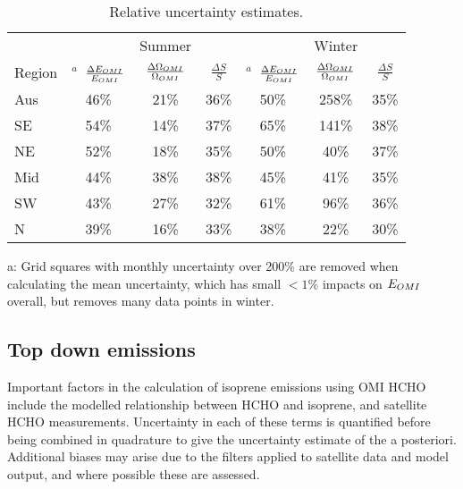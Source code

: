   \begin{table}\begin{threeparttable}
      \caption{Relative uncertainty estimates.}
      \begin{tabular}{ l | c  c  c | c c c} 
        \toprule
        & & Summer & & & Winter & \\
        Region & $^a$~$\frac{\Delta E_{OMI}}{E_{OMI}}$ & $\frac{\Delta \Omega_{OMI}}{\Omega_{OMI}}$ & $\frac{\Delta S}{S}$ 
          & $^a$~$\frac{\Delta E_{OMI}}{E_{OMI}}$ & $\frac{\Delta \Omega_{OMI}}{\Omega_{OMI}}$ & $\frac{\Delta S}{S}$ \\
        \midrule
          Aus &   46\% &   21\% &   36\% &   50\% &  258\% &   35\% \\
          SE &   54\% &   14\% &   37\% &   65\% &  141\% &   38\% \\
          NE &   52\% &   18\% &   35\% &   50\% &   40\% &   37\% \\
          Mid &   44\% &   38\% &   38\% &   45\% &   41\% &   35\% \\
          SW &   43\% &   27\% &   32\% &   61\% &   96\% &   36\% \\
          N &   39\% &   16\% &   33\% &   38\% &   22\% &   30\% \\
        \bottomrule
      \end{tabular}
      \begin{tablenotes} 
        \item a: Grid squares with monthly uncertainty over 200\% are removed when calculating the mean uncertainty, which has small $<1\%$ impacts on $E_{OMI}$ overall, but removes many data points in winter. 
      \end{tablenotes}
      \label{BioIsop:uncertainty:tab_uncertainties}
    \end{threeparttable}\end{table}
    
    
    
  \subsection{Top down emissions}
    \label{BioIsop:uncertainty:eomi}
    
    Important factors in the calculation of isoprene emissions using OMI HCHO include the modelled relationship between HCHO and isoprene, and satellite HCHO measurements.
    Uncertainty in each of these terms is quantified before being combined in quadrature to give the uncertainty estimate of the a posteriori.
    Additional biases may arise due to the filters applied to satellite data and model output, and where possible these are assessed. 
    

